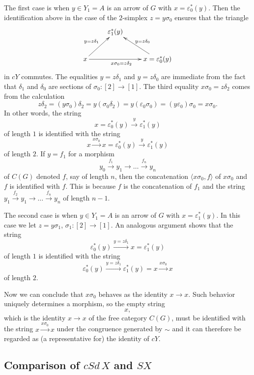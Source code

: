 The first case is when $y\in Y_1=A$ is an arrow of $G$ with $x=\varepsilon _0^*(y)$. Then the identification above in the case of the $2$-simplex $z=y\sigma _0$ ensures that the triangle
\begin{displaymath}
 \xymatrix{
 & \varepsilon ^*_1(y) \\
 x \ar[ur]^{y=z\delta _1} \ar[rr]_{x\sigma _0=z\delta _2} && x=\varepsilon ^*_0(y) \ar[lu]_{y=z\delta _0}
 }
\end{displaymath}
in $cY$ commutes. The equalities $y=z\delta _1$ and $y=z\delta _0$ are immediate from the fact that $\delta _1$ and $\delta _0$ are sections of $\sigma_0:[2]\to [1]$. The third equality $x\sigma _0=z\delta _2$ comes from the calculation
\[z\delta _2=(y\sigma _0)\delta _2=y(\sigma _0\delta _2)=y(\varepsilon _0\sigma _0)=(y\varepsilon _0)\sigma _0=x\sigma _0.\]
In other words, the string
\[x=\varepsilon ^*_0(y)\xrightarrow{y} \varepsilon ^*_1(y)\]
of length $1$ is identified with the string
\[x\xrightarrow{x\sigma _0} x=\varepsilon ^*_0(y)\xrightarrow{y} \varepsilon ^*_1(y)\]
of length $2$. If $y=f_1$ for a morphism
\[y_0\xrightarrow{f_1} y_1\to \dots \xrightarrow{f_n} y_n\]
of $C(G)$ denoted $f$, say of length $n$, then the concatenation $\langle x\sigma _0,f\rangle$ of $x\sigma _0$ and $f$ is identified with $f$. This is because $f$ is the concatenation of $f_1$ and the string $y_1\xrightarrow{f_2} y_1\to \dots \xrightarrow{f_n} y_n$ of length $n-1$.

The second case is when $y\in Y_1=A$ is an arrow of $G$ with $x=\varepsilon _1^*(y)$. In this case we let $z=y\sigma _1$, $\sigma _1:[2]\to [1]$. An analogous argument shows that the string
\[\varepsilon ^*_0(y)\xrightarrow{y=z\delta _1} x=\varepsilon ^*_1(y)\]
of length $1$ is identified with the string
\[\varepsilon ^*_0(y)\xrightarrow{y=z\delta _1} \varepsilon ^*_1(y)=x\xrightarrow{x\sigma _0} x\]
of length $2$.

Now we can conclude that $x\sigma _0$ behaves as the identity $x\to x$. Such behavior uniquely determines a morphism, so the empty string
\[x,\]
which is the identity $x\to x$ of the free category $C(G)$, must be identified with the string $x\xrightarrow{x\sigma _0} x$ under the congruence generated by $\sim$ and it can therefore be regarded as (a representative for) the identity of $cY$.


\subsection{Comparison of $cSd\, X$ and $SX$}


